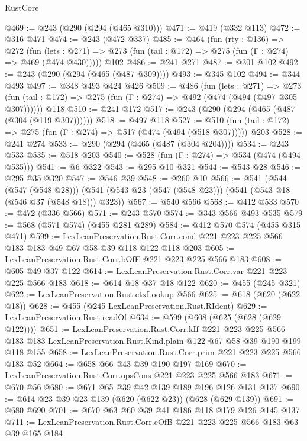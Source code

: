 \begin{lexlean}{RustCore}
\begin{coremodule}
@469 := @243 (@290 (@294 (@465 @310)))
@471 := @419 (@332 @113)
@472 := @316 @471
@474 := @243 (@472 @337)
@485 := @464
    (fun (rty : @136) =>
    @272
      (fun (lets : @271) => @273 (fun (tail : @172) => @275 (fun (Γ : @274) => @469 (@474 @430)))))
    @102
@486 := @241 @271
@487 := @301 @102
@492 := @243 (@290 (@294 (@465 (@487 @309))))
@493 := @345 @102
@494 := @344 @493
@497 := @348 @493 @424 @426
@509 := @486
    (fun (lets : @271) =>
    @273 (fun (tail : @172) => @275 (fun (Γ : @274) => @492 (@474 (@494 (@497 @305 @307))))))
    @118
@510 := @241 @172
@517 := @243 (@290 (@294 (@465 (@487 (@304 (@119 @307))))))
@518 := @497 @118
@527 := @510 (fun (tail : @172) => @275 (fun (Γ : @274) => @517 (@474 (@494 (@518 @307))))) @203
@528 := @241 @274
@533 := @290 (@294 (@465 (@487 (@304 @204))))
@534 := @243 @533
@535 := @518 @203
@540 := @528 (fun (Γ : @274) => @534 (@474 (@494 @535)))
@541 := @6 @322
@543 := @295 @10 @321
@544 := @543 @28
@546 := @295 @35 @320
@547 := @546 @39
@548 := @260 @10
@566 := @541
    (@544 (@547 (@548 @28)))
    (@541 (@543 @23 (@547 (@548 @23))) (@541 (@543 @18 (@546 @37 (@548 @18))) @323))
@567 := @540 @566
@568 := @412 @533
@570 := @472 (@336 @566)
@571 := @243 @570
@574 := @343 @566 @493 @535
@579 := @568 (@571 @574) (@455 @281 @289)
@584 := @412 @570 @574 (@455 @315 @471)
@599 := LexLeanPreservation.Rust.Corr.cond
    @221
    @223
    @225
    @566
    @183
    @183
    @49
    @67
    @58
    @39
    @118
    @122
    @118
    @203
@605 := LexLeanPreservation.Rust.Corr.bOfE @221 @223 @225 @566 @183
@608 := @605 @49 @37 @122
@614 := LexLeanPreservation.Rust.Corr.var @221 @223 @225 @566 @183
@618 := @614 @18 @37 @18 @122
@620 := @455 (@245 @321)
@622 := LexLeanPreservation.Rust.ctxLookup @566
@625 := @618 (@620 (@622 @18))
@628 := @455 (@245 LexLeanPreservation.Rust.RIdent)
@629 := LexLeanPreservation.Rust.readOf
@634 := @599 (@608 (@625 (@628 (@629 @122))))
@651 := LexLeanPreservation.Rust.Corr.kIf
    @221
    @223
    @225
    @566
    @183
    @183
    LexLeanPreservation.Rust.Kind.plain
    @122
    @67
    @58
    @39
    @190
    @199
    @118
    @155
@658 := LexLeanPreservation.Rust.Corr.prim @221 @223 @225 @566 @183 @52
@664 := @658 @66 @43 @39 @190 @197 @169
@670 := LexLeanPreservation.Rust.Corr.opsCons @221 @223 @225 @566 @183
@671 := @670 @56
@680 := @671 @65 @39 @42 @139 @189 @196 @126 @131 @137
@690 := @614 @23 @39 @23 @139 (@620 (@622 @23)) (@628 (@629 @139))
@691 := @680 @690
@701 := @670 @63 @60 @39 @41 @186 @118 @179 @126 @145 @137
@711 := LexLeanPreservation.Rust.Corr.eOfB @221 @223 @225 @566 @183 @63 @39 @165 @184

\end{coremodule}
\end{lexlean}
